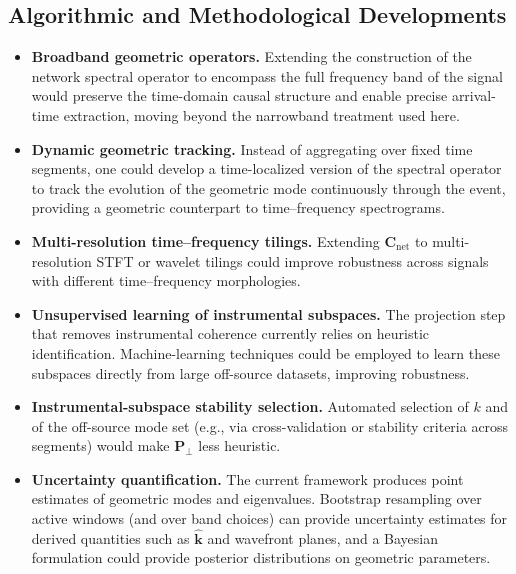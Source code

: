 \documentclass[11pt,a4paper]{article}
\begin{document}
\subsection{Algorithmic and Methodological Developments}
\begin{itemize}
    \item \textbf{Broadband geometric operators.} Extending the construction of the network spectral operator to encompass the full frequency band of the signal would preserve the time-domain causal structure and enable precise arrival-time extraction, moving beyond the narrowband treatment used here.

    \item \textbf{Dynamic geometric tracking.} Instead of aggregating over fixed time segments, one could develop a time-localized version of the spectral operator to track the evolution of the geometric mode continuously through the event, providing a geometric counterpart to time--frequency spectrograms.

    \item \textbf{Multi-resolution time--frequency tilings.} Extending $\mathbf{C}_{\mathrm{net}}$ to multi-resolution STFT or wavelet tilings could improve robustness across signals with different time--frequency morphologies.

    \item \textbf{Unsupervised learning of instrumental subspaces.} The projection step that removes instrumental coherence currently relies on heuristic identification. Machine-learning techniques could be employed to learn these subspaces directly from large off-source datasets, improving robustness.

    \item \textbf{Instrumental-subspace stability selection.} Automated selection of $k$ and of the off-source mode set (e.g., via cross-validation or stability criteria across segments) would make $\mathbf{P}_\perp$ less heuristic.

    \item \textbf{Uncertainty quantification.} The current framework produces point estimates of geometric modes and eigenvalues. Bootstrap resampling over active windows (and over band choices) can provide uncertainty estimates for derived quantities such as $\hat{\mathbf{k}}$ and wavefront planes, and a Bayesian formulation could provide posterior distributions on geometric parameters.
\end{itemize}
\end{document}
